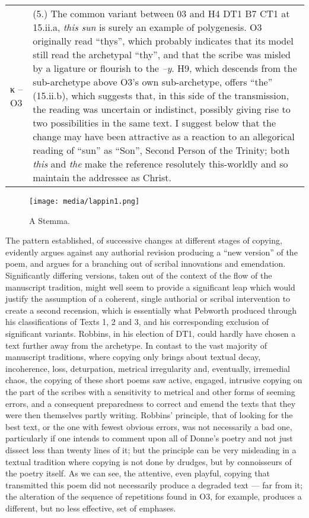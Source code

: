 \begin{paper}
\begin{center}
\begin{longtable}[]{@{}lp{}@{}}
    κ -- O3 & (5.) The common variant between 03 and H4 DT1 B7 CT1 at 15.ii.a,
    \emph{this sun} is surely an example of polygenesis. O3 originally read
    ``thys'', which probably indicates that its model still read the
    archetypal ``thy'', and that the scribe was misled by a ligature or
    flourish to the \textit{--y}. H9, which descends from the sub-archetype above
    O3's own sub-archetype, offers ``the'' (15.ii.b), which suggests that,
    in this side of the transmission, the reading was uncertain or
    indistinct, possibly giving rise to two possibilities in the same text.
    I suggest below that the change may have been attractive as a reaction
    to an allegorical reading of ``sun'' as ``Son'', Second Person of the
    Trinity; both \emph{this} and \emph{the} make the reference resolutely
    this-worldly and so maintain the addressee as Christ.

\end{longtable}
\end{center}

\begin{figure}[H]
\centering
\texttt{[image: media/lappin1.png]}
\caption{A Stemma.}
\label{fig:lappin:stemma}
\end{figure}


\noindent The pattern established, of successive changes at different stages of
copying, evidently argues against any authorial revision producing a
``new version'' of the poem, and argues for a branching out of scribal
innovations and emendation. Significantly differing versions, taken out
of the context of the flow of the manuscript tradition, might well seem
to provide a significant leap which would justify the assumption of a
coherent, single authorial or scribal intervention to create a second
recension, which is essentially what Pebworth produced through his
classifications of Texts 1, 2 and 3, and his corresponding exclusion of
significant variants. Robbins, in his election of DT1, could hardly have
chosen a text further away from the archetype. In contast to the vast
majority of manuscript traditions, where copying only brings about
textual decay, incoherence, loss, deturpation, metrical irregularity
and, eventually, irremedial chaos, the copying of these short poems saw
active, engaged, intrusive copying on the part of the scribes with a
sensitivity to metrical and other forms of seeming errors, and a
consequent preparedness to correct and emend the texts that they were
then themselves partly writing. Robbins' principle, that of looking for
the best text, or the one with fewest obvious errors, was not
necessarily a bad one, particularly if one intends to comment upon all
of Donne's poetry and not just dissect less than twenty lines of it; but
the principle can be very misleading in a textual tradition where
copying is not done by drudges, but by connoisseurs of the poetry
itself. As we can see, the attentive, even playful, copying that
transmitted this poem did not necessarily produce a degraded text ---
far from it; the alteration of the sequence of repetitions found in O3,
for example, produces a different, but no less effective, set of
emphases.


\end{paper}
